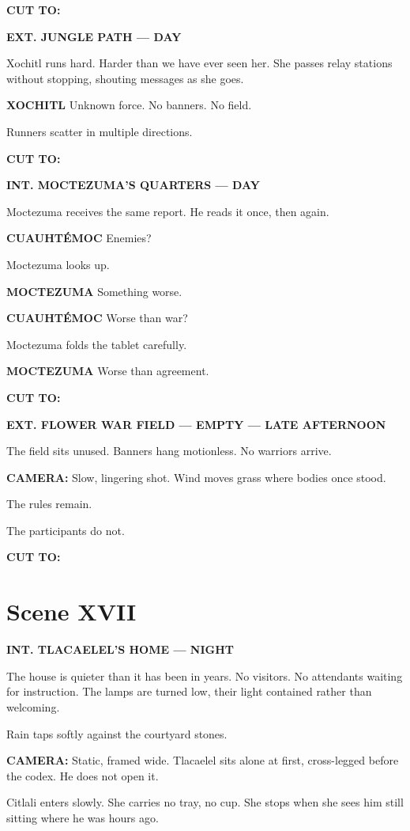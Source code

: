 \documentclass[12pt]{article}
\begin{document}
\textbf{CUT TO:}

\textbf{EXT. JUNGLE PATH — DAY}

Xochitl runs hard. Harder than we have ever seen her. She passes relay stations without stopping, shouting messages as she goes.

\textbf{XOCHITL}  
Unknown force.  
No banners.  
No field.

Runners scatter in multiple directions.

\textbf{CUT TO:}

\textbf{INT. MOCTEZUMA’S QUARTERS — DAY}

Moctezuma receives the same report. He reads it once, then again.

\textbf{CUAUHTÉMOC}  
Enemies?

Moctezuma looks up.

\textbf{MOCTEZUMA}  
Something worse.

\textbf{CUAUHTÉMOC}  
Worse than war?

Moctezuma folds the tablet carefully.

\textbf{MOCTEZUMA}  
Worse than agreement.

\textbf{CUT TO:}

\textbf{EXT. FLOWER WAR FIELD — EMPTY — LATE AFTERNOON}

The field sits unused. Banners hang motionless. No warriors arrive.

\textbf{CAMERA:} Slow, lingering shot. Wind moves grass where bodies once stood.

The rules remain.

The participants do not.

\textbf{CUT TO:}

\section*{Scene XVII}

\textbf{INT. TLACAELEL’S HOME — NIGHT}

The house is quieter than it has been in years. No visitors. No attendants waiting for instruction. The lamps are turned low, their light contained rather than welcoming.

Rain taps softly against the courtyard stones.

\textbf{CAMERA:} Static, framed wide. Tlacaelel sits alone at first, cross-legged before the codex. He does not open it.

Citlali enters slowly. She carries no tray, no cup. She stops when she sees him still sitting where he was hours ago.
\end{document}
